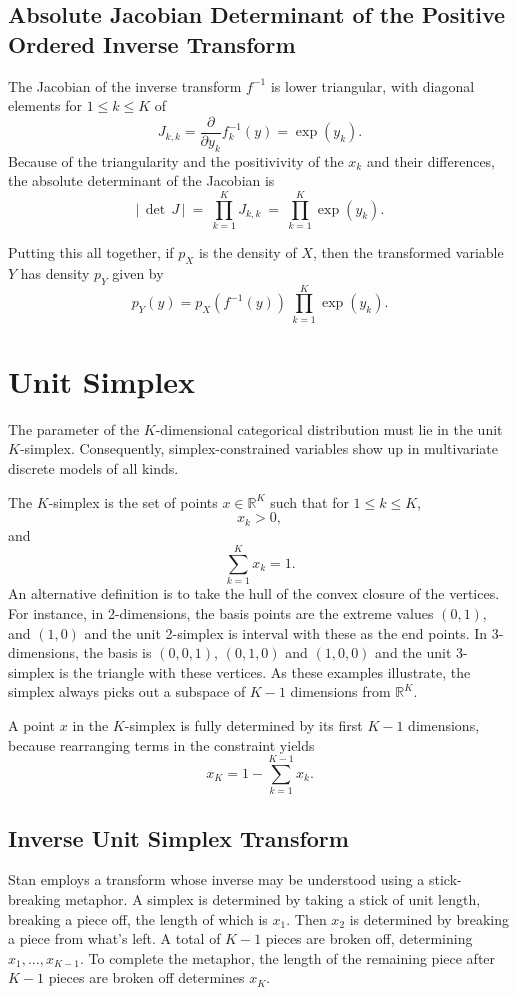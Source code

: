 \documentclass[10pt]{report}
\begin{document}
\subsection{Absolute Jacobian Determinant of the Positive Ordered
  Inverse Transform}

The Jacobian of the inverse transform $f^{-1}$ is lower triangular,
with diagonal elements for $1 \leq k \leq K$ of
\[
J_{k,k} = \frac{\partial}{\partial y_k} f_k^{-1}(y) = \exp(y_k).
\]
%
Because of the triangularity and the positivivity of the $x_k$ and
their differences, the absolute determinant of the Jacobian is
%
\[
\left| \, \det \, J \, \right|
\ = \ 
\prod_{k=1}^K J_{k,k}
\ = \ 
\prod_{k=1}^K \exp(y_k).
\]


Putting this all together, if $p_X$ is the density of $X$, then the
transformed variable $Y$ has density $p_Y$ given by
%
\[
p_Y(y)
= p_X(f^{-1}(y)) 
\
\prod_{k=1}^K \exp(y_k).
\]


\section{Unit Simplex}

The parameter of the $K$-dimensional categorical distribution must lie
in the unit $K$-simplex.  Consequently, simplex-constrained variables show
up in multivariate discrete models of all kinds.  

The $K$-simplex is the set of points $x \in \mathbb{R}^K$ such that
for $1 \leq k \leq K$, 
\[ 
x_k > 0,
\] 
and
\[
\sum_{k=1}^K x_k = 1.
\]
%   
An alternative definition is to take the hull of the convex closure of
the vertices.  For instance, in 2-dimensions, the basis points are the
extreme values $(0,1)$, and $(1,0)$ and the unit 2-simplex is interval
with these as the end points.  In 3-dimensions, the basis is
$(0,0,1)$, $(0,1,0)$ and $(1,0,0)$ and the unit 3-simplex is the
triangle with these vertices.  As these examples illustrate, the
simplex always picks out a subspace of $K-1$ dimensions from
$\mathbb{R}^K$.

A point $x$ in the $K$-simplex is fully determined by its first $K-1$
dimensions, because rearranging terms in the constraint yields
%
\[
x_K = 1 - \sum_{k=1}^{K-1} x_k.
\]
%

\subsection{Inverse Unit Simplex Transform}

Stan employs a transform whose inverse may be understood using a
stick-breaking metaphor.  A simplex is determined by taking a stick of
unit length, breaking a piece off, the length of which is $x_1$.  Then
$x_2$ is determined by breaking a piece from what's left.  A total of
$K-1$ pieces are broken off, determining $x_1,\ldots,x_{K-1}$.  To
complete the metaphor, the length of the remaining piece after $K-1$
pieces are broken off determines $x_K$.
\end{document}
